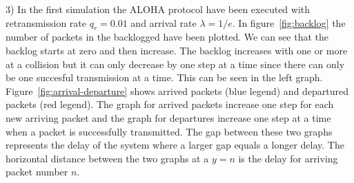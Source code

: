 \documentclass{article}
\begin{document}
3) In the first simulation the ALOHA protocol have been executed with retransmission rate $q_r=0.01$ and arrival rate $\lambda=1/e$. In figure~\ref{fig:backlog} the number of packets in the backlogged have been plotted. We can see that the backlog starts at zero and then increase. The backlog increases with one or more at a collision but it can only decrease by one step at a time since there can only be one succesful transmission at a time. This can be seen in the left graph. Figure~\ref{fig:arrival-departure} shows arrived packets (blue legend) and departured packets (red legend). The graph for arrived packets increase one step for each new arriving packet and the graph for departures increase one step at a time when a packet is successfully transmitted. The gap between these two graphs represents the delay of the system where a larger gap equals a longer delay. The horizontal distance between the two graphs at a $y=n$ is the delay for arriving packet number $n$. 
\end{document}
